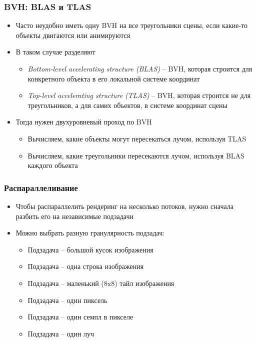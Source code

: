 \documentclass[handout,10pt]{beamer}
\begin{document}
\begin{frame}[fragile]
\frametitle{BVH: BLAS и TLAS}
\begin{itemize}
\item Часто неудобно иметь одну BVH на все треугольники сцены, если какие-то объекты двигаются или анимируются
\pause
\item В таком случае разделяют
\pause
\begin{itemize}
\item \textit{Bottom-level accelerating structure (BLAS)} -- BVH, которая строится для конкретного объекта в его локальной системе координат
\pause
\item \textit{Top-level accelerating structure (TLAS)} -- BVH, которая строится не для треугольников, а для самих объектов, в системе координат сцены
\end{itemize}
\pause
\item Тогда нужен двухуровневый проход по BVH
\pause
\begin{itemize}
\item Вычисляем, какие объекты могут пересекаться лучом, используя TLAS
\pause
\item Вычисляем, какие треугольники пересекаются лучом, используя BLAS каждого объекта
\end{itemize}
\end{itemize}
\end{frame}

\begin{frame}[fragile]
\frametitle{Распараллеливание}
\begin{itemize}
\item Чтобы распараллелить рендеринг на несколько потоков, нужно сначала разбить его на независимые подзадачи
\pause
\item Можно выбрать разную гранулярность подзадач:
\pause
\begin{itemize}
\item Подзадача -- большой кусок изображения
\pause
\item Подзадача -- одна строка изображения
\pause
\item Подзадача -- маленький (8x8) тайл изображения
\pause
\item Подзадача -- один пиксель
\pause
\item Подзадача -- один семпл в пикселе
\pause
\item Подзадача -- один луч
\end{itemize}
\end{itemize}
\end{frame}
\end{document}
